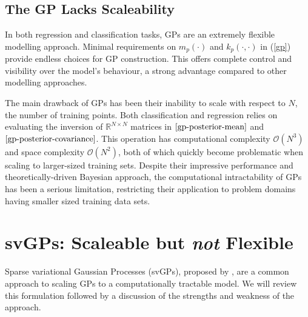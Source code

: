 \documentclass{article}
\numberwithin{equation}{section}
\begin{document}
\subsection{The GP Lacks Scaleability}
In both regression and classification tasks, GPs are an extremely flexible modelling approach. Minimal requirements on $m_p(\cdot)$ and $k_p(\cdot, \cdot)$ in (\ref{gp}) provide endless choices for GP construction. This offers complete control and visibility over the model's behaviour, a strong advantage compared to other modelling approaches. 

The main drawback of GPs has been their inability to scale with respect to $N$, the number of training points. Both classification and regression relies on evaluating the inversion of $\mathbb{R}^{N \times N}$ matrices in $\ref{gp-posterior-mean}$ and $\ref{gp-posterior-covariance}$. This operation has computational complexity $\mathcal{O}(N^3)$ and space complexity $\mathcal{O}(N^2)$, both of which quickly become problematic when scaling to larger-sized training sets. Despite their impressive performance and theoretically-driven Bayesian approach, the computational intractability of GPs has been a serious limitation, restricting their application to problem domains having smaller sized training data sets. 


\newpage
\section{svGPs: Scaleable but \textit{not} Flexible}
Sparse variational Gaussian Processes (svGPs), proposed by \cite{titsias2009variational}, are a common approach to scaling GPs to a computationally tractable model. We will review this formulation followed by a discussion of the strengths and weakness of the approach.
\end{document}
